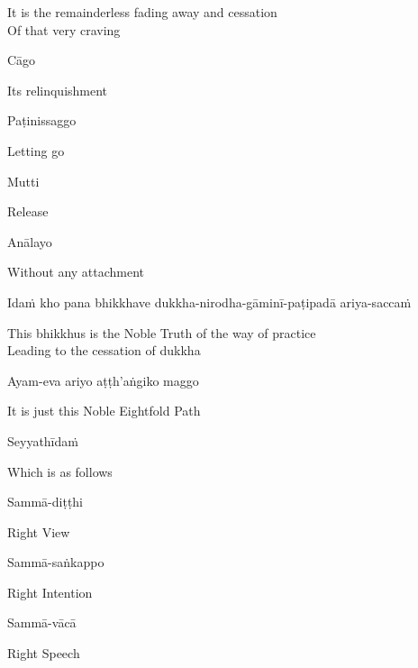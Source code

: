 \begin{cprenglish}
  It is the remainderless fading away and cessation\\
  Of that very craving
\end{cprenglish}

Cāgo

\begin{cprenglish}
  Its relinquishment
\end{cprenglish}

Paṭinissaggo

\begin{cprenglish}
  Letting go
\end{cprenglish}

Mutti

\begin{cprenglish}
  Release
\end{cprenglish}

Anālayo

\begin{cprenglish}
  Without any attachment
\end{cprenglish}

Idaṁ kho pana bhikkhave dukkha-nirodha-gāminī-paṭipadā ariya-saccaṁ

\begin{cprenglish}
  This bhikkhus is the Noble Truth of the way of practice\\
  Leading to the cessation of dukkha
\end{cprenglish}

Ayam-eva ariyo aṭṭh’aṅgiko maggo

\begin{cprenglish}
  It is just this Noble Eightfold Path
\end{cprenglish}

Seyyathīdaṁ

\begin{cprenglish}
  Which is as follows
\end{cprenglish}

Sammā-diṭṭhi

\begin{cprenglish}
  Right View
\end{cprenglish}

Sammā-saṅkappo

\begin{cprenglish}
  Right Intention
\end{cprenglish}

Sammā-vācā

\begin{cprenglish}
  Right Speech
\end{cprenglish}

